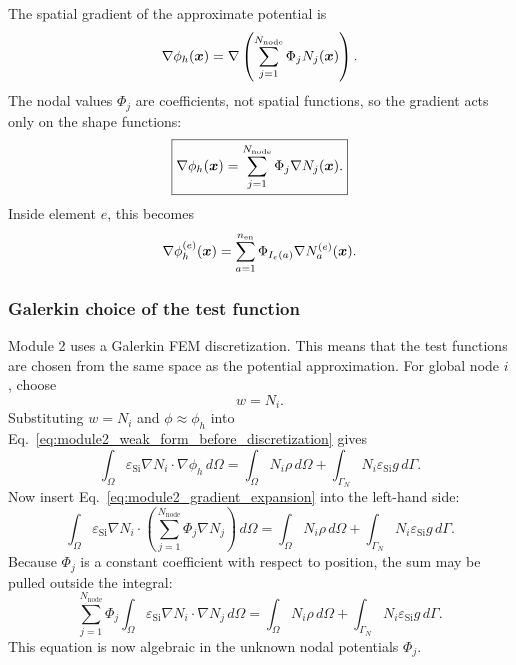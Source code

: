 \documentclass[11pt]{article}
\begin{document}
The spatial gradient of the approximate potential is
\begin{equation}
\nabla \phi_h(\bm{x})
= \nabla \left(\sum_{j=1}^{N_{\mathrm{node}}} \Phi_j N_j(\bm{x})\right).
\end{equation}
The nodal values $\Phi_j$ are coefficients, not spatial functions, so the gradient acts only on the shape functions:
\begin{equation}
\boxed{
\nabla \phi_h(\bm{x})
= \sum_{j=1}^{N_{\mathrm{node}}} \Phi_j \nabla N_j(\bm{x}).
}
\label{eq:module2_gradient_expansion}
\end{equation}
Inside element $e$, this becomes
\begin{equation}
\nabla \phi_h^{(e)}(\bm{x})
= \sum_{a=1}^{n_{\mathrm{en}}} \Phi_{I_e(a)} \nabla N_a^{(e)}(\bm{x}).
\end{equation}

\subsubsection{Galerkin choice of the test function}

Module 2 uses a Galerkin FEM discretization. This means that the test functions are chosen from the same space as the potential approximation. For global node $i$, choose
\begin{equation}
w = N_i.
\end{equation}
Substituting $w=N_i$ and $\phi \approx \phi_h$ into Eq.~\eqref{eq:module2_weak_form_before_discretization} gives
\begin{equation}
\int_{\Omega} \varepsilon_{\mathrm{Si}} \nabla N_i \cdot \nabla \phi_h \, d\Omega
= \int_{\Omega} N_i \rho \, d\Omega
+ \int_{\Gamma_N} N_i \varepsilon_{\mathrm{Si}} g \, d\Gamma .
\label{eq:module2_weak_with_test_Ni}
\end{equation}
Now insert Eq.~\eqref{eq:module2_gradient_expansion} into the left-hand side:
\begin{equation}
\int_{\Omega} \varepsilon_{\mathrm{Si}} \nabla N_i \cdot
\left(\sum_{j=1}^{N_{\mathrm{node}}} \Phi_j \nabla N_j\right)
\, d\Omega
= \int_{\Omega} N_i \rho \, d\Omega
+ \int_{\Gamma_N} N_i \varepsilon_{\mathrm{Si}} g \, d\Gamma .
\end{equation}
Because $\Phi_j$ is a constant coefficient with respect to position, the sum may be pulled outside the integral:
\begin{equation}
\sum_{j=1}^{N_{\mathrm{node}}} \Phi_j
\int_{\Omega} \varepsilon_{\mathrm{Si}} \nabla N_i \cdot \nabla N_j \, d\Omega
= \int_{\Omega} N_i \rho \, d\Omega
+ \int_{\Gamma_N} N_i \varepsilon_{\mathrm{Si}} g \, d\Gamma .
\label{eq:module2_discrete_equation_before_Kb}
\end{equation}
This equation is now algebraic in the unknown nodal potentials $\Phi_j$.
\end{document}
